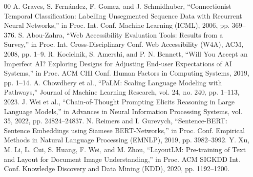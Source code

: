\documentclass[conference]{IEEEtran}
\begin{document}
\begin{thebibliography}{00}
 A. Graves, S. Fernández, F. Gomez, and J. Schmidhuber, ``Connectionist Temporal Classification: Labelling Unsegmented Sequence Data with Recurrent Neural Networks,'' in Proc. Int. Conf. Machine Learning (ICML), 2006, pp. 369--376.
 S. Abou-Zahra, ``Web Accessibility Evaluation Tools: Results from a Survey,'' in Proc. Int. Cross-Disciplinary Conf. Web Accessibility (W4A), ACM, 2008, pp. 1--9.
 R. Kocielnik, S. Amershi, and P. N. Bennett, ``Will You Accept an Imperfect AI? Exploring Designs for Adjusting End-user Expectations of AI Systems,'' in Proc. ACM CHI Conf. Human Factors in Computing Systems, 2019, pp. 1--14.
 A. Chowdhery et al., ``PaLM: Scaling Language Modeling with Pathways,'' Journal of Machine Learning Research, vol. 24, no. 240, pp. 1--113, 2023.
 J. Wei et al., ``Chain-of-Thought Prompting Elicits Reasoning in Large Language Models,'' in Advances in Neural Information Processing Systems, vol. 35, 2022, pp. 24824--24837.
 N. Reimers and I. Gurevych, ``Sentence-BERT: Sentence Embeddings using Siamese BERT-Networks,'' in Proc. Conf. Empirical Methods in Natural Language Processing (EMNLP), 2019, pp. 3982--3992.
 Y. Xu, M. Li, L. Cui, S. Huang, F. Wei, and M. Zhou, ``LayoutLM: Pre-training of Text and Layout for Document Image Understanding,'' in Proc. ACM SIGKDD Int. Conf. Knowledge Discovery and Data Mining (KDD), 2020, pp. 1192--1200.
\end{thebibliography}
\end{document}
